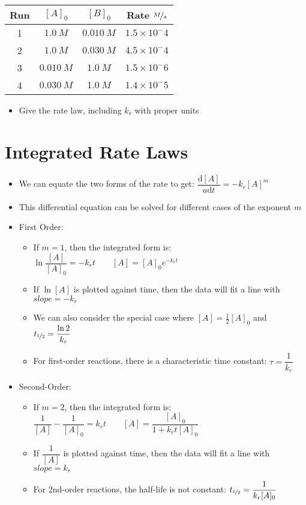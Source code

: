 \documentclass[12pt, openany, letterpaper]{memoir}
\begin{document}
\begin{tabular}{c|c|c|c}
	Run	&	$[A]_0$	&	$[B]_0$ &	Rate $\nicefrac{M}{s}$ \\ \midrule \midrule
	1	& 	$1.0~M$& 	$0.010~M$ &	$1.5\times10^-4$ \\ \midrule
	2	& 	$1.0~M$& 	$0.030~M$ &	$4.5\times10^-4$ \\ \midrule
	3	& 	$0.010~M$& 	$1.0~M$ &	$1.5\times10^-6$ \\ \midrule
	4	& 	$0.030~M$& 	$1.0~M$ &	$1.4\times10^-5$ \\
\end{tabular}
\begin{itemize}
	\item Give the rate law, including $k_r$ with proper units
\end{itemize}
\section{Integrated Rate Laws}
\begin{itemize}
	\item We can equate the two forms of the rate to get: $\dfrac{\mathrm{d}[A]}{a\mathrm{d}t} = -k_r[A]^m$
	\item This differential equation can be solved for different cases of the exponent $m$
	\item First Order:
	\begin{itemize}
		\item If $m=1$, then the integrated form is: $\ln \dfrac{[A]}{[A]_0}=-k_rt \hspace{2em} [A]=[A]_0e^{-k_rt}$
		\item If $\ln [A]$ is plotted against time, then the data will fit a line with $slope = -k_r$
		\item We can also consider the special case where $[A] = \frac{1}{2}[A]_0$ and $t_{\nicefrac{1}{2}} = \dfrac{\ln 2}{k_r}$
		\item For first-order reactions, there is a characteristic time constant: $\tau = \dfrac{1}{k_r}$
	\end{itemize}
	\item Second-Order:
	\begin{itemize}
		\item If $m=2$, then the integrated form is: $\dfrac{1}{[A]}-\dfrac{1}{[A]_0} = k_rt \hspace{2em} [A] = \dfrac{[A]_0}{1+k_rt[A]_0}$
		\item If $\dfrac{1}{[A]}$ is plotted against time, then the data will fit a line with $slope=k_r$
		\item For 2nd-order reactions, the half-life is not constant: $t_{\nicefrac{1}{2}}=\dfrac{1}{k_r[A]_0}$
	\end{itemize}
\end{itemize}
\end{document}
